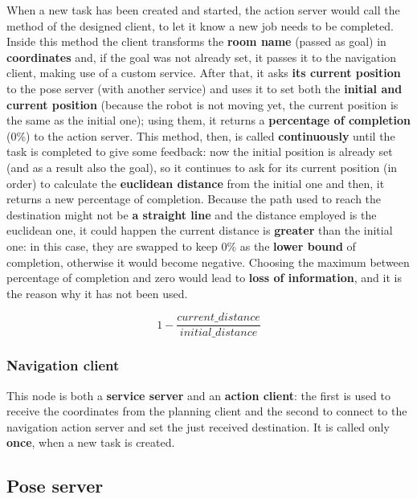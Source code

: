 When a new task has been created and started, the action server would call the  method of the designed client, to let it know a new job needs to be completed.
Inside this method the client transforms the \textbf{room name} (passed as goal) in \textbf{coordinates} and, if the goal was not already set, it passes it to the navigation client, making use of a custom service. After that, it asks \textbf{its current position} to the pose server (with another service) and uses it to set both the \textbf{initial and current position} (because the robot is not moving yet, the current position is the same as the initial one); using them, it returns a \textbf{percentage of completion} (0\%) to the action server.
This method, then, is called \textbf{continuously} until the task is completed to give some feedback: now the initial position is already set (and as a result also the goal), so it continues to ask for its current position (in order) to calculate the \textbf{euclidean distance} from the initial one and then, it returns a new percentage of completion. Because the path used to reach the destination might not be \textbf{a straight line} and the distance employed is the euclidean one, it could happen the current distance is \textbf{greater} than the initial one: in this case, they are swapped to keep 0\% as the \textbf{lower bound} of completion, otherwise it would become negative. Choosing the maximum between percentage of completion and zero would lead to \textbf{loss of information}, and it is the reason why it has not been used. 

$$ 1-\dfrac{current\_distance}{initial\_distance} $$

\subsubsection{Navigation client} %

This node is both a \textbf{service server} and an \textbf{action client}: the first is used to receive the coordinates from the planning client and the second to connect to the navigation action server and set the just received destination. It is called only \textbf{once}, when a new task is created.

\subsection{Pose server} %
\label{sub:pose}

